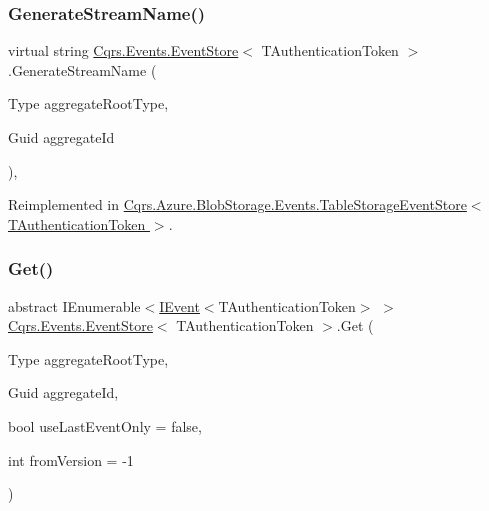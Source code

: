 \mbox{\label{classCqrs_1_1Events_1_1EventStore_aba61739e47fdd0f7fce656f896cbe908_aba61739e47fdd0f7fce656f896cbe908}} 
\subsubsection{\texorpdfstring{Generate\+Stream\+Name()}{GenerateStreamName()}\hspace{0.1cm}{\footnotesize\ttfamily [2/2]}}
{\footnotesize\ttfamily virtual string \hyperlink{classCqrs_1_1Events_1_1EventStore}{Cqrs.\+Events.\+Event\+Store}$<$ T\+Authentication\+Token $>$.Generate\+Stream\+Name (\begin{DoxyParamCaption}\item[{Type}]{aggregate\+Root\+Type,  }\item[{Guid}]{aggregate\+Id }\end{DoxyParamCaption})\hspace{0.3cm}{\ttfamily [protected]}, {\ttfamily [virtual]}}



Reimplemented in \hyperlink{classCqrs_1_1Azure_1_1BlobStorage_1_1Events_1_1TableStorageEventStore_a5cee1f388c1a03d9cfea5ee1a9f42657_a5cee1f388c1a03d9cfea5ee1a9f42657}{Cqrs.\+Azure.\+Blob\+Storage.\+Events.\+Table\+Storage\+Event\+Store$<$ T\+Authentication\+Token $>$}.

\mbox{\label{classCqrs_1_1Events_1_1EventStore_aa1d0d399a35c1e3b0759e27202695d8b_aa1d0d399a35c1e3b0759e27202695d8b}} 
\subsubsection{\texorpdfstring{Get()}{Get()}\hspace{0.1cm}{\footnotesize\ttfamily [1/2]}}
{\footnotesize\ttfamily abstract I\+Enumerable$<$\hyperlink{interfaceCqrs_1_1Events_1_1IEvent}{I\+Event}$<$T\+Authentication\+Token$>$ $>$ \hyperlink{classCqrs_1_1Events_1_1EventStore}{Cqrs.\+Events.\+Event\+Store}$<$ T\+Authentication\+Token $>$.Get (\begin{DoxyParamCaption}\item[{Type}]{aggregate\+Root\+Type,  }\item[{Guid}]{aggregate\+Id,  }\item[{bool}]{use\+Last\+Event\+Only = {\ttfamily false},  }\item[{int}]{from\+Version = {\ttfamily -\/1} }\end{DoxyParamCaption})\hspace{0.3cm}{\ttfamily [pure virtual]}}




